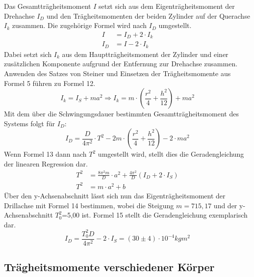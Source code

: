 \documentclass[titlepage = firstcover]{scrartcl}
\begin{document}
      Das Gesamtträgheitsmoment $I$ setzt sich aus dem Eigenträgheitsmoment der Drehachse $I_D$ und den Trägheitsmomenten der beiden Zylinder auf der Querachse 
      $I_k$ zusammen. Die zugehörige Formel wird nach $I_D$ umgestellt.
      \begin{align*}
        I &= I_D + 2 \cdot I_k \\
        I_D &= I -2 \cdot I_k
      \end{align*}
      Dabei setzt sich $I_k$ aus dem Hauptträgheitsmoment der Zylinder und einer zusätzlichen Komponente aufgrund der Entfernung zur Drehachse zusammen.
      Anwenden des Satzes von Steiner und Einsetzen der Trägheitsmomente aus Formel 5 führen zu Formel 12.
      \begin{equation}
        I_k = I_S + ma^2 \Rightarrow I_k = m \cdot (\frac{r^2}{4} + \frac{h^2}{12}) + ma^2
      \end{equation}
      Mit dem über die Schwingungsdauer bestimmten Gesamtträgheitsmoment des Systems folgt für $I_D$:
      \begin{equation}
        I_D = \frac{D}{4\pi^2} \cdot T^2 - 2m \cdot (\frac{r^2}{4} + \frac{h^2}{12}) - 2 \cdot ma^2
      \end{equation}
      Wenn Formel 13 dann nach $T^2$ umgestellt wird, stellt dies die Geradengleichung der linearen Regression dar.
      \begin{align}
        T^2 &= \frac{8\pi^2m}{D} \cdot a^2  + \frac{4\pi^2}{D}(I_D + 2 \cdot I_S) \\
        T^2 &= m \cdot a^2 + b
      \end{align}
      Über den y-Achsenabschnitt lässt sich nun das Eigenträgheitsmoment der Drillachse mit Formel 14 bestimmen, wobei die Steigung $m = 715,17$ und der y-Achsenabschnitt $T_0^2$=5,00 ist.
      Formel 15 stellt die Geradengleichung exemplarisch dar.
      \begin{equation*}
        I_D = \frac{T_0^2D}{4\pi^2} - 2 \cdot I_S = (30 \pm 4) \cdot 10^{-4}kgm^2
      \end{equation*}
      

      \subsection{Trägheitsmomente verschiedener Körper}
      
     
      
\end{document}
